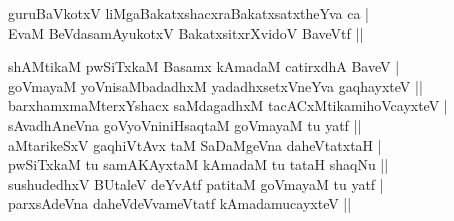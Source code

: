 \begin{entry}
\smallskip
\begin{shl}
guruBaVkotxV liMgaBakatxshacxraBakatxsatxtheYva ca |\\
EvaM BeVdasamAyukotxV BakatxsitxrXvidoV BaveVtf ||
\end{shl}
\end{entry}

\begin{entry}
\smallskip
\begin{shl}
shAMtikaM pwSiTxkaM Basamx kAmadaM catirxdhA BaveV |\\
goVmayaM yoVnisaMbadadhxM yadadhxsetxVneYva gaqhayxteV ||\\
barxhamxmaMterxYshacx saMdagadhxM tacACxMtikamihoVcayxteV |\\
sAvadhAneVna goVyoVniniHsaqtaM goVmayaM tu yatf ||\\
aMtarikeSxV gaqhiVtAvx taM SaDaMgeVna daheVtatxtaH |\\
pwSiTxkaM tu samAKAyxtaM kAmadaM tu tataH shaqNu ||\\
sushudedhxV BUtaleV deYvAtf patitaM goVmayaM tu yatf |\\
parxsAdeVna daheVdeVvameVtatf kAmadamucayxteV ||
\end{shl}
\medskip
{}
\end{entry}

